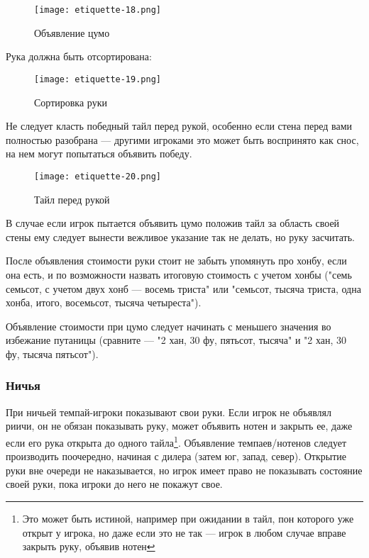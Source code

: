 \begin{figure}[H]
	\centering
	\texttt{[image: etiquette-18.png]}
	\caption{Объявление цумо}
\end{figure}

Рука должна быть отсортирована:

\begin{figure}[H]
	\centering
	\texttt{[image: etiquette-19.png]}
	\caption{Сортировка руки}
\end{figure}

Не следует класть победный тайл перед рукой, особенно если стена перед вами полностью разобрана --- другими игроками это может быть воспринято как снос, на нем могут попытаться объявить победу.

\begin{figure}[H]
	\centering
	\texttt{[image: etiquette-20.png]}
	\caption{Тайл перед рукой}
\end{figure}

В случае если игрок пытается объявить цумо положив тайл за область своей стены ему следует вынести вежливое указание так не делать, но руку засчитать. 

После объявления стоимости руки стоит не забыть упомянуть про хонбу, если она есть, и по возможности назвать итоговую стоимость с учетом хонбы ("семь семьсот, с учетом двух хонб --- восемь триста" или "семьсот, тысяча триста, одна хонба, итого, восемьсот, тысяча четыреста").

Объявление стоимости при цумо следует начинать с меньшего значения во избежание путаницы (сравните --- "2 хан, 30 фу, пятьсот, тысяча" и "2 хан, 30 фу, тысяча пятьсот").

\subsubsection{Ничья}

При ничьей темпай-игроки показывают свои руки. Если игрок не объявлял риичи, он не обязан показывать руку, может объявить нотен и закрыть ее, даже если его рука открыта до одного тайла\footnote{Это может быть истиной, например при ожидании в тайл, пон которого уже открыт у игрока, но даже если это не так --- игрок в любом случае вправе закрыть руку, объявив нотен}. Объявление темпаев/нотенов следует производить поочередно, начиная с дилера (затем юг, запад, север). Открытие руки вне очереди не наказывается, но игрок имеет право не показывать состояние своей руки, пока игроки до него не покажут свое.

